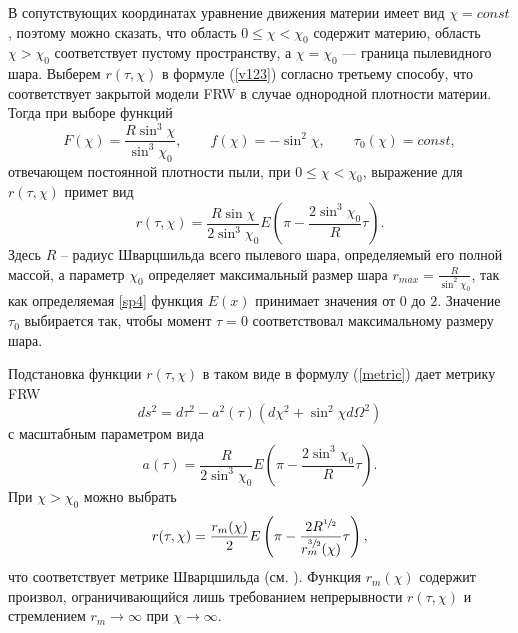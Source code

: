 \documentclass[12pt]{article}
\newcommand{\bq}{\begin{equation}}
\newcommand{\eq}{\end{equation}}
\begin{document}
В сопутствующих координатах уравнение движения материи имеет вид $\chi = const$, поэтому можно сказать, что область $0 \leqslant \chi < \chi_0$ содержит материю, область $\chi > \chi_0$ соответствует пустому пространству, а $\chi = \chi_0$ --- граница пылевидного шара.
Выберем $r(\tau, \chi)$ в формуле (\ref{v123}) согласно третьему способу, что соответствует закрытой модели FRW в случае однородной плотности материи.
Тогда при выборе функций
\bq
F(\chi) = \frac{R \sin^3{\chi}}{\sin^3{\chi_0}}, \qquad f(\chi) = -\sin^2{\chi}, \qquad \tau_0(\chi) = const,
\eq
отвечающем постоянной плотности пыли, при $0 \leqslant \chi < \chi_0$, выражение для $r(\tau, \chi)$ примет вид
\bq
	r(\tau, \chi) = \frac{R \sin{\chi}}{2 \sin^3{\chi_0}}  E \left( \pi - \frac{2 \sin^3{\chi_0}}{R} \tau \right).
\eq
Здесь $R$ -- радиус Шварцшильда всего пылевого шара, определяемый его полной массой, а
параметр $\chi_0$ определяет максимальный размер шара $r_{max} = \frac{R}{\sin^2{\chi_0}}$,
так как определяемая \eqref{sp4} функция $E(x)$ принимает значения от $0$ до $2$. Значение $\tau_0$ выбирается так, чтобы момент $\tau = 0$ соответствовал максимальному размеру шара.

Подстановка функции $r(\tau, \chi)$ в таком виде в формулу (\ref{metric}) дает метрику FRW
\bq
ds^2 = d\tau^2 - a^2(\tau) \left(d\chi^2 + \sin^2{\chi}d\Omega^2 \right)
\eq
с масштабным параметром вида
\bq\label{spp1}
a(\tau) = \frac{R}{2 \sin^3{\chi_0}} E \left( \pi - \frac{2 \sin^3{\chi_0}}{R} \tau \right).
\eq
При $\chi > \chi_0$ можно выбрать
\bq
r(\tau, \chi) = \frac{r_m(\chi)}{2} E \left( \pi - \frac{2R^{\sfrac{1}{2}}}{r^{\sfrac{3}{2}}_m(\chi)} \tau \right),
\eq
что соответствует метрике Шварцшильда (см. \cite{landavshic2,novfrol}).
Функция $r_m(\chi)$ содержит произвол, ограничивающийся лишь требованием непрерывности $r(\tau, \chi)$ и стремлением $r_m \to \infty$ при $\chi \to \infty$.
\end{document}
